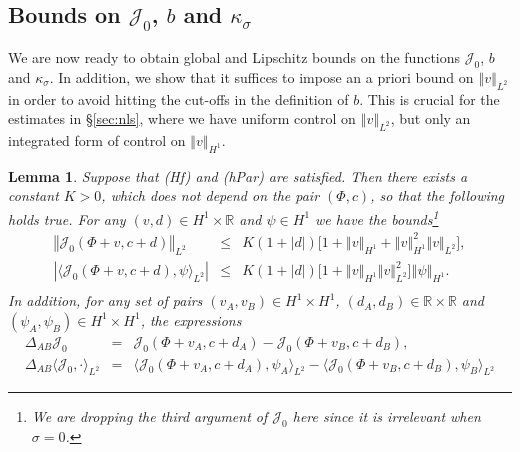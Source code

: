 \documentclass[10pt]{articleHJ}
\newcommand{\Real}{\mathbb{R}}							%
\newcommand{\abs}[1]{\left\vert#1\right\vert}			%
\newcommand{\norm}[1]{\left\Vert#1\right\Vert}		%
\newtheorem{lem}[thm]{Lemma}
\numberwithin{equation}{section}
\begin{document}
\subsection{Bounds on $\mathcal{J}_0$, $b$ and $\kappa_\sigma$}
\label{sec:prlm:rest}

We are now ready to obtain global and Lipschitz bounds
on the functions $\mathcal{J}_0$, $b$ and $\kappa_{\sigma}$.
In addition, we show that it suffices to impose an a priori bound
on $\norm{v}_{L^2}$ in order to avoid hitting the cut-offs in the definition of $b$.
This is crucial for the estimates in \S\ref{sec:nls}, where we have
uniform control on $\norm{v}_{L^2}$, but only
an integrated form of control on $\norm{v}_{H^1}$.





\begin{lem}
\label{lem:prlm:j0:bnds}
Suppose that (Hf) and (hPar) are satisfied.
Then there exists a constant $K > 0$, which does not
depend on the pair $(\Phi, c)$, so that the following holds true.
For any $(v, d) \in H^1 \times \Real$ and $\psi \in H^1$
we have the bounds\footnote{ We are dropping the third argument of $\mathcal{J}_0$ here since it is irrelevant when $\sigma = 0$.}
\begin{equation}
\label{eq:prlm:j0:glb:bnds}
\begin{array}{lcl}
 \norm{\mathcal{J}_0(\Phi + v, c + d)}_{L^2} & \le &
   K (1 + \abs{d} ) \big[
     1 + \norm{v}_{H^1} + \norm{v}^2_{H^1} \norm{v}_{L^2}
   \big] ,
\\[0.2cm]
 \abs{\langle \mathcal{J}_0(\Phi + v, c + d), \psi
    \rangle_{L^2} }
   & \le &
      K (1 + \abs{d} ) \big[
     1 +  \norm{v}_{H^1} \norm{v}_{L^2}^2
   \big]
       \norm{\psi}_{H^1} .
\\[0.2cm]
\end{array}
\end{equation}
In addition, for any set
of pairs
$(v_A, v_B) \in H^1 \times H^1$,
$(d_A, d_B) \in \Real \times \Real$
and $(\psi_A, \psi_B) \in H^1 \times H^1$,
the expressions
\begin{equation}
\begin{array}{lcl}
\Delta_{AB} \mathcal{J}_0
  & = &
    \mathcal{J}_0(\Phi + v_A, c +  d_A)
  - \mathcal{J}_0(\Phi + v_B, c + d_B) ,
\\[0.2cm]
\Delta_{AB} \langle \mathcal{J}_0, \cdot \rangle_{L^2}
  & = &
    \langle \mathcal{J}_0(\Phi + v_A, c +  d_A) , \psi_A \rangle_{L^2}
  - \langle \mathcal{J}_0(\Phi + v_B, c +  d_B) ,
    \psi_B \rangle_{L^2}

\end{array}
\end{equation}
\end{lem}
\end{document}
